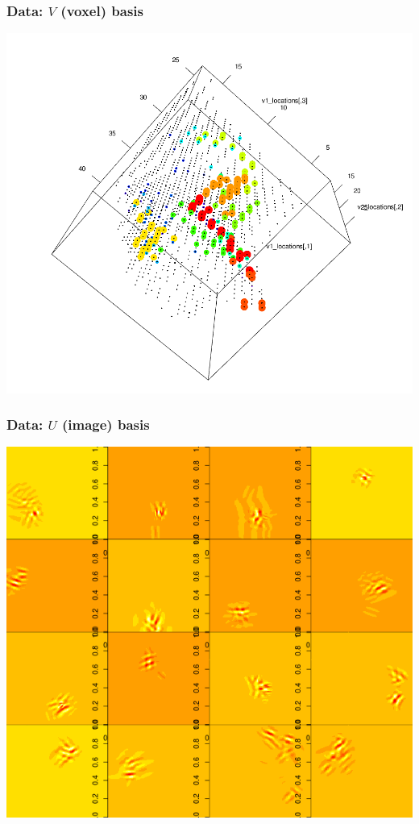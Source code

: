 \documentclass{beamer}
\begin{document}
\begin{frame}
\frametitle{Data: $V$ (voxel) basis}
\begin{center}
\includegraphics[scale=0.25]{cca2.png}
\end{center}
\end{frame}

\begin{frame}
\frametitle{Data: $U$ (image) basis}
\begin{center}
\includegraphics[scale=0.3]{cca3.png}
\end{center}
\end{frame}
\end{document}
